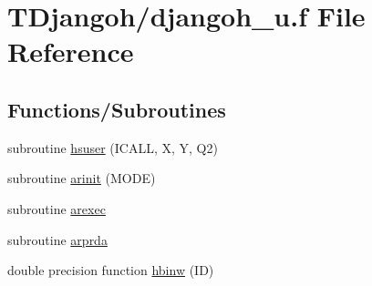 \hypertarget{djangoh__u_8f}{\section{T\+Djangoh/djangoh\+\_\+u.f File Reference}
\label{djangoh__u_8f}
}
\subsection*{Functions/\+Subroutines}
\begin{DoxyCompactItemize}
\item 
subroutine \hyperlink{djangoh__u_8f_a96d7acf0122c4a21c1d461d27da11680}{hsuser} (I\+C\+A\+L\+L, X, Y, Q2)
\item 
subroutine \hyperlink{djangoh__u_8f_a6eff116680f2c31838b816f026b6bc4b}{arinit} (M\+O\+D\+E)
\item 
subroutine \hyperlink{djangoh__u_8f_a3fb9648a29b61ff83c5d5109273d1d2f}{arexec}
\item 
subroutine \hyperlink{djangoh__u_8f_a419b2d89c04c8355a7b8cb1b39c2eaae}{arprda}
\item 
double precision function \hyperlink{djangoh__u_8f_af22db7eb1d03f2627c021608064d87dc}{hbinw} (I\+D)
\end{DoxyCompactItemize}


